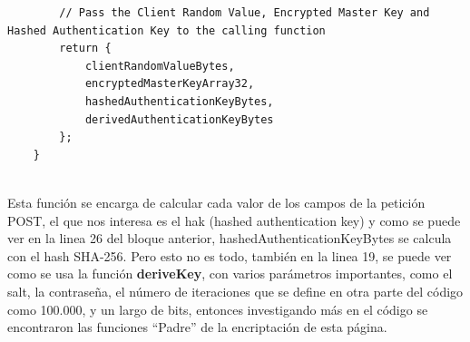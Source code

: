 \documentclass[letter,12pt]{article}
\begin{document}
\begin{verbatim}
        // Pass the Client Random Value, Encrypted Master Key and Hashed Authentication Key to the calling function
        return {
            clientRandomValueBytes,
            encryptedMasterKeyArray32,
            hashedAuthenticationKeyBytes,
            derivedAuthenticationKeyBytes
        };
    }
    
\end{verbatim}

Esta función se encarga de calcular cada valor de los campos de la petición POST, el que nos interesa es el hak (hashed authentication key) y como se puede ver en la linea 26 del bloque anterior, hashedAuthenticationKeyBytes se calcula con el hash SHA-256. Pero esto no es todo, también en la linea 19, se puede ver como se usa la función \textbf{deriveKey}, con varios parámetros importantes, como el salt, la contraseña, el número de iteraciones que se define en otra parte del código como 100.000, y un largo de bits, entonces investigando más en el código se encontraron las funciones ``Padre'' de la encriptación de esta página.
\end{document}
